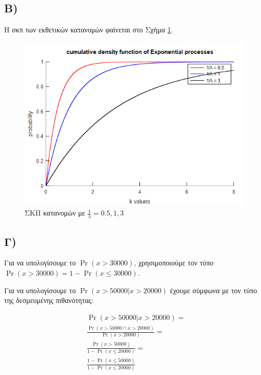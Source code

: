 \documentclass{article}
\begin{document}
\subsection*{Β)}

Η σκπ των εκθετικών κατανομών φαίνεται στο Σχήμα \ref{fig:exponential_cdf}.

\begin{figure}
    \centering
    \includegraphics[width=\textwidth]{exponential_cdf.png}
    \caption{ΣΚΠ κατανομών με $\frac{1}{λ} = {0.5, 1, 3}$}
    \label{fig:exponential_cdf}
\end{figure}

\subsection*{Γ)}

Για να υπολογίσουμε το $\Pr{(x > 30000)}$, χρησιμοποιούμε τον τύπο \\
$\Pr{(x > 30000)} = 1 - \Pr{(x \leq 30000)}$. 

Για να υπολογίσουμε το $\Pr{(x > 50000 | x > 20000)}$ έχουμε σύμφωνα με τον τύπο της δεσμευμένης πιθανότητας:

\begin{align*}
    & \Pr{(x > 50000 | x > 20000)} = \\
    & \frac{\Pr{(x > 50000 \cap x > 20000)}}{\Pr{(x > 20000)}} = \\
    & \frac{\Pr{(x > 50000)}}{1 - \Pr{(x \leq 20000)}} = \\
    & \frac{1 - \Pr{(x \leq 50000)}}{1 - \Pr(x \leq 20000)}
\end{align*}
\end{document}
